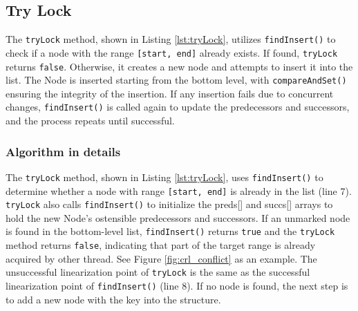 \subsection{Try Lock}\label{subsec:tryLock}

The \texttt{tryLock} method, shown in Listing \ref{lst:tryLock}, utilizes \texttt{findInsert()} to check if a node with the range \texttt{[start, end]} already exists. If found, \texttt{tryLock} returns \texttt{false}. 
Otherwise, it creates a new node and attempts to insert it into the list. 
The Node is inserted starting from the bottom level, with \texttt{compareAndSet()} ensuring the integrity of the insertion. 
If any insertion fails due to concurrent changes, \texttt{findInsert()} is called again to update the predecessors and successors, and the process repeats until successful.

\vspace{15pt}
\begin{figure}[h]
    \centering
    
\end{figure}

\subsubsection*{Algorithm in details}
The \texttt{tryLock} method, shown in Listing \ref{lst:tryLock}, uses \texttt{findInsert()} to determine whether a node with range \texttt{[start, end]} is already in the list (line 7). 
\texttt{tryLock} also calls \texttt{findInsert()} to initialize the preds[] and succs[] arrays to hold the new Node's ostensible predecessors and successors.
If an unmarked node is found in the bottom-level list, \texttt{findInsert()} returns \texttt{true} and the \texttt{tryLock} method returns \texttt{false}, indicating that part of the target range is already acquired by other thread.
See Figure \ref{fig:crl_conflict} as an example.
The unsuccessful linearization point of \texttt{tryLock} is the same as the successful linearization point of \texttt{findInsert()} (line 8). 
If no node is found, the next step is to add a new node with the key into the structure.

